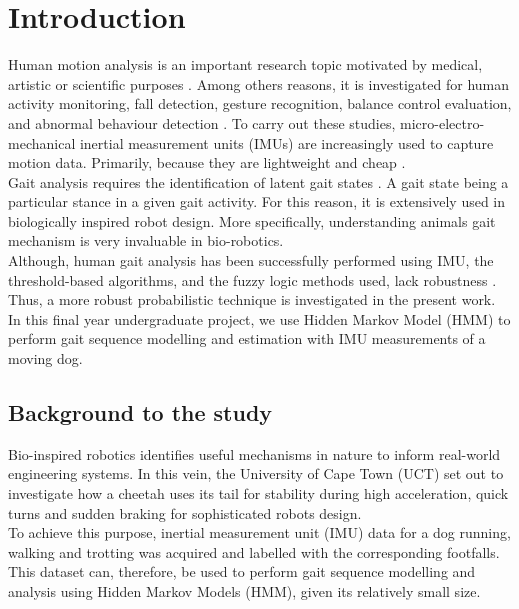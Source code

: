 \chapter{Introduction} \label{chap:intro}

Human motion analysis is an important research topic motivated by medical, artistic or scientific purposes \cite{towa2009}. Among others reasons, it is investigated for human activity monitoring, fall detection, gesture recognition, balance control evaluation, and abnormal behaviour detection \cite{cont2013}. To carry out these studies, micro-electro-mechanical inertial measurement units (IMUs) are increasingly used to capture motion data. Primarily, because they are lightweight and cheap \cite{ches2012} \cite{towa2009} \cite{cont2013}.\\
Gait analysis requires the identification of latent gait states \cite{cont2013}. A gait state being a particular stance in a given gait activity.
For this reason, it is extensively used in biologically inspired robot design. More specifically, understanding animals gait mechanism is very invaluable in bio-robotics.\\
Although, human gait analysis has been successfully performed using IMU, the threshold-based algorithms, %
and the fuzzy logic methods %
used, lack robustness \cite{cont2013}. Thus, a more robust probabilistic technique is investigated in the present work. In this final year undergraduate project, we use Hidden Markov Model (HMM) to perform gait sequence modelling and estimation with IMU measurements of a moving dog.


\section{Background to the study}
Bio-inspired robotics identifies useful mechanisms in nature to inform real-world engineering systems. In this vein, the University of Cape Town (UCT) set out to investigate how a cheetah uses its tail for stability during high acceleration, quick turns and sudden braking for sophisticated robots design. \\
To achieve this purpose, inertial measurement unit (IMU) data for a dog running, walking and trotting was acquired and labelled with the corresponding footfalls.\\
This dataset can, therefore, be used to perform gait sequence modelling and analysis using Hidden Markov Models (HMM), given its relatively small size. 	%

